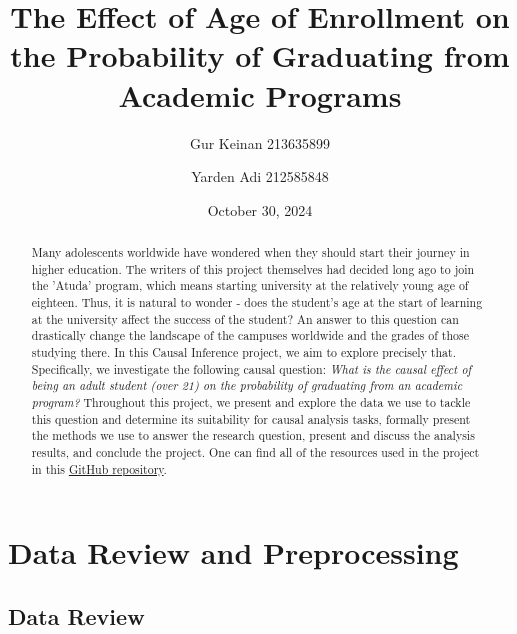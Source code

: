 \documentclass[11pt]{article}
\title{The Effect of Age of Enrollment on the Probability of Graduating from Academic Programs}
\author{Gur Keinan 213635899 \and Yarden Adi 212585848}
\date{October 30, 2024}
\newcommand{\gur}[1]{{\color{teal}{Gur: #1}}}
\begin{document}
\maketitle

\begin{abstract}
    Many adolescents worldwide have wondered when they should start their journey in higher education. The writers of this project themselves had decided long ago to join the 'Atuda' program, which means starting university at the relatively young age of eighteen. Thus, it is natural to wonder - does the student's age at the start of learning at the university affect the success of the student? An answer to this question can drastically change the landscape of the campuses worldwide and the grades of those studying there. In this Causal Inference project, we aim to explore precisely that. Specifically, we investigate the following causal question: \emph{What is the causal effect of being an adult student (over 21) on the probability of graduating from an academic program?} Throughout this project, we present and explore the data we use to tackle this question and determine its suitability for causal analysis tasks, formally present the methods we use to answer the research question, present and discuss the analysis results, and conclude the project. One can find all of the resources used in the project in this \href{https://github.com/GurKeinan/Causal-Inference-Project-Effect-of-Age-on-Graduating}{GitHub repository}.
\end{abstract}

\gur{changing our question to 'What is the causal effect of enrolling as an adult student (age 21 or older) on the probability of graduating from an academic program within the allotted time?', say somewhere in the paper why we determined the target to be like this}


\section{Data Review and Preprocessing}

\gur{Opening sentence.}

\subsection{Data Review}
\end{document}
